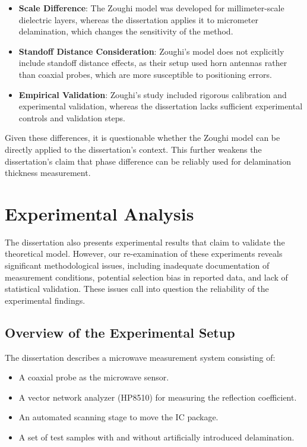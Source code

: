 \documentclass[10pt,twocolumn]{article}
\begin{document}
\begin{itemize}
    \item \textbf{Scale Difference}: The Zoughi model was developed for millimeter-scale dielectric layers, whereas the dissertation applies it to micrometer delamination, which changes the sensitivity of the method.
    \item \textbf{Standoff Distance Consideration}: Zoughi’s model does not explicitly include standoff distance effects, as their setup used horn antennas rather than coaxial probes, which are more susceptible to positioning errors.
    \item \textbf{Empirical Validation}: Zoughi’s study included rigorous calibration and experimental validation, whereas the dissertation lacks sufficient experimental controls and validation steps.
\end{itemize}

Given these differences, it is questionable whether the Zoughi model can be directly applied to the dissertation’s context. This further weakens the dissertation’s claim that phase difference can be reliably used for delamination thickness measurement.


\section{Experimental Analysis}

The dissertation also presents experimental results that claim to validate the theoretical model. However, our re-examination of these experiments reveals significant methodological issues, including inadequate documentation of measurement conditions, potential selection bias in reported data, and lack of statistical validation. These issues call into question the reliability of the experimental findings.

\subsection{Overview of the Experimental Setup}

The dissertation describes a microwave measurement system consisting of:
\begin{itemize}
    \item A coaxial probe as the microwave sensor.
    \item A vector network analyzer (HP8510) for measuring the reflection coefficient.
    \item An automated scanning stage to move the IC package.
    \item A set of test samples with and without artificially introduced delamination.
\end{itemize}
\end{document}
